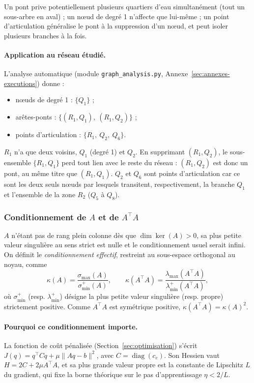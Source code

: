\documentclass[11pt]{ama-article}
\begin{document}
Un pont prive potentiellement plusieurs quartiers d'eau simultanément (tout un sous-arbre en
aval) ; un nœud de degré 1 n'affecte que lui-même ; un point d'articulation généralise le pont
à la suppression d'un nœud, et peut isoler plusieurs branches à la fois.

\paragraph{Application au réseau étudié.} L'analyse automatique (module
\texttt{graph\_analysis.py}, Annexe~\ref{sec:annexes-executions}) donne :
\begin{itemize}[nosep]
\item nœuds de degré 1 : $\{Q_1\}$ ;
\item arêtes-ponts : $\{(R_1,Q_1),\ (R_1,Q_2)\}$ ;
\item points d'articulation : $\{R_1,\ Q_2,\ Q_6\}$.
\end{itemize}
$R_1$ n'a que deux voisins, $Q_1$ (degré 1) et $Q_2$. En supprimant $(R_1,Q_2)$, le
sous-ensemble $\{R_1,Q_1\}$ perd tout lien avec le reste du réseau : $(R_1,Q_2)$ est donc un
pont, au même titre que $(R_1,Q_1)$. $Q_2$ et $Q_6$ sont points d'articulation car ce sont les
deux seuls nœuds par lesquels transitent, respectivement, la branche $Q_1$ et l'ensemble de la
zone $R_2$ ($Q_5$ à $Q_8$).

\subsubsection{Conditionnement de $A$ et de $A^\top A$}

\begin{definition}
$A$ n'étant pas de rang plein colonne dès que $\dim\ker(A)>0$, sa plus petite valeur singulière
au sens strict est nulle et le conditionnement usuel serait infini. On définit le
\emph{conditionnement effectif}, restreint au sous-espace orthogonal au noyau, comme
\begin{equation}
\kappa(A) = \frac{\sigma_{\max}(A)}{\sigma_{\min}^{+}(A)}, \qquad
\kappa(A^\top A) = \frac{\lambda_{\max}(A^\top A)}{\lambda_{\min}^{+}(A^\top A)},
\end{equation}
où $\sigma_{\min}^{+}$ (resp. $\lambda_{\min}^{+}$) désigne la plus petite valeur singulière
(resp. propre) strictement positive. Comme $A^\top A$ est symétrique positive,
$\kappa(A^\top A)=\kappa(A)^2$.
\end{definition}

\paragraph{Pourquoi ce conditionnement importe.} La fonction de coût pénalisée
(Section~\ref{sec:optimisation}) s'écrit $J(q)=q^\top C q+\mu\|Aq-b\|^2$, avec
$C=\operatorname{diag}(c_e)$. Son Hessien vaut $H=2C+2\mu A^\top A$, et sa plus grande valeur
propre est la constante de Lipschitz $L$ du gradient, qui fixe la borne théorique sur le pas
d'apprentissage $\eta<2/L$.
\end{document}
